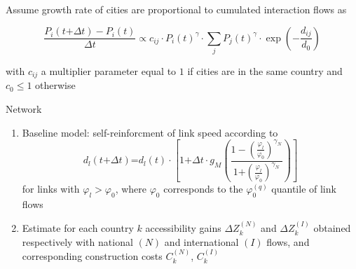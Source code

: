 \documentclass[12pt]{iopart}
\begin{document}
\bigskip
\bigskip

Assume growth rate of cities are proportional to cumulated interaction flows as


\[
\frac{P_i \left(t \textrm{+} \Delta t\right) - P_i\left(t\right)}{\Delta t} \propto c_{ij} \cdot P_i\left(t\right)^{\gamma} \cdot \sum_j P_j\left(t\right)^{\gamma} \cdot \exp\left(- \frac{d_{ij}}{d_0}\right)
\]


with $c_{ij}$ a multiplier parameter equal to $1$ if cities are in the same country and $c_0 \leq 1$ otherwise








Network






\begin{enumerate}
	\item Baseline model: self-reinforcment of link speed according to
	\[
	d_l\left(t \textrm{+} \Delta t\right) \textrm{=} d_l\left(t\right) \cdot \left[ 1 \textrm{+} \Delta t \cdot g_M \left( \frac{1 - \left(\frac{\varphi_l}{\varphi_0}\right)^{\gamma_N}}{1 \textrm{+} \left(\frac{\varphi_l}{\varphi_0}\right)^{\gamma_N}} \right) \right]	
	\]
	for links with $\varphi_l > \varphi_0$, where $\varphi_0$ corresponds to the $\varphi_0^{(q)}$ quantile of link flows
	\item Estimate for each country $k$ accessibility gains $\Delta Z_k^{(N)}$ and $\Delta Z_k^{(I)}$ obtained respectively with national $(N)$ and international $(I)$ flows, and corresponding construction costs $C_k^{(N)}$, $C_k^{(I)}$
\end{enumerate}
\end{document}
